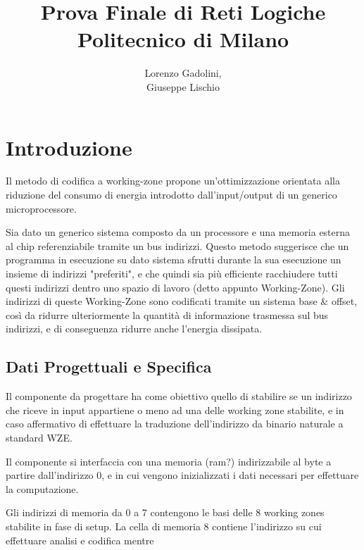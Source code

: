\documentclass{article}
\title{Prova Finale di Reti Logiche\\ \large Politecnico di Milano}
\author{Lorenzo Gadolini, \\ Giuseppe Lischio}
\begin{document}
\maketitle


\tableofcontents


\newpage
{}




\setcounter{page}{1}


\section{Introduzione}

Il metodo di codifica a working-zone propone un'ottimizzazione orientata alla riduzione del consumo di energia introdotto dall'input/output di un generico microprocessore.

Sia dato un generico sistema composto da un processore e una memoria esterna al chip referenziabile tramite un bus indirizzi. Questo metodo suggerisce che un programma in esecuzione su dato sistema sfrutti durante la sua esecuzione un insieme di indirizzi "preferiti", e che quindi sia più efficiente racchiudere tutti questi indirizzi dentro uno spazio di lavoro (detto appunto Working-Zone). Gli indirizzi di queste Working-Zone sono codificati tramite un sistema base \& offset, così da ridurre ulteriormente la quantità di informazione trasmessa sul bus indirizzi, e di conseguenza ridurre anche l'energia dissipata.



\subsection{Dati Progettuali e Specifica}


Il componente da progettare ha come obiettivo quello di stabilire se un indirizzo che riceve in input appartiene o meno ad una delle working zone stabilite, e in caso affermativo di effettuare la traduzione dell'indirizzo da binario naturale a standard WZE.

Il componente si interfaccia con una memoria (ram?) indirizzabile al byte a partire dall'indirizzo 0, e in cui vengono inizializzati i dati necessari per effettuare la computazione.

Gli indirizzi di memoria da 0 a 7 contengono le basi delle 8 working zones stabilite in fase di setup. La cella di memoria 8 contiene l'indirizzo su cui effettuare analisi e codifica mentre
\end{document}
